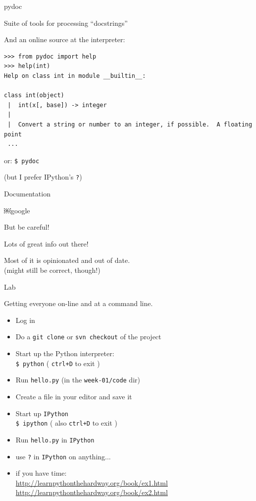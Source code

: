\documentclass{beamer}
\begin{document}
\begin{frame}[fragile]{pydoc}

{Suite of tools for processing ``docstrings''}

And an online source at the interpreter:

\begin{verbatim}
>>> from pydoc import help
>>> help(int)
Help on class int in module __builtin__:

class int(object)
 |  int(x[, base]) -> integer
 |  
 |  Convert a string or number to an integer, if possible.  A floating point
 ...
\end{verbatim}
or: \verb+$ pydoc+

(but I prefer IPython's  \verb+?+)

\end{frame} 

\begin{frame}[fragile]{Documentation}

{\LARGE￼google}

\vspace{0.25in}
But  be careful!

\vspace{0.25in}
Lots of great info out there!

\vspace{0.25in}
Most of it is opinionated and out of date.\\
(might still be correct, though!)

\end{frame} 

\begin{frame}[fragile]{Lab}

{\Large Getting everyone on-line and at a command line.}

\begin{itemize}
    \item Log in
    \item Do a \verb+git clone+ or \verb+svn checkout+ of the project
    \item Start up the Python interpreter:\\
          \verb+$ python+  ( \verb=ctrl+D= to exit )
    \item Run \verb+hello.py+ (in the \verb+week-01/code+ dir)
    \item Create a file in your editor and save it
    \item Start up \verb+IPython+ \\
          \verb+$ ipython+ ( also \verb=ctrl+D= to exit )
    \item Run \verb+hello.py+ in \verb+IPython+
    \item use \verb+?+ in \verb+IPython+ on anything...
    \item if you have time:\\
\url{http://learnpythonthehardway.org/book/ex1.html}\\
\url{http://learnpythonthehardway.org/book/ex2.html}

    
\end{itemize}

\end{frame} 
\end{document}
